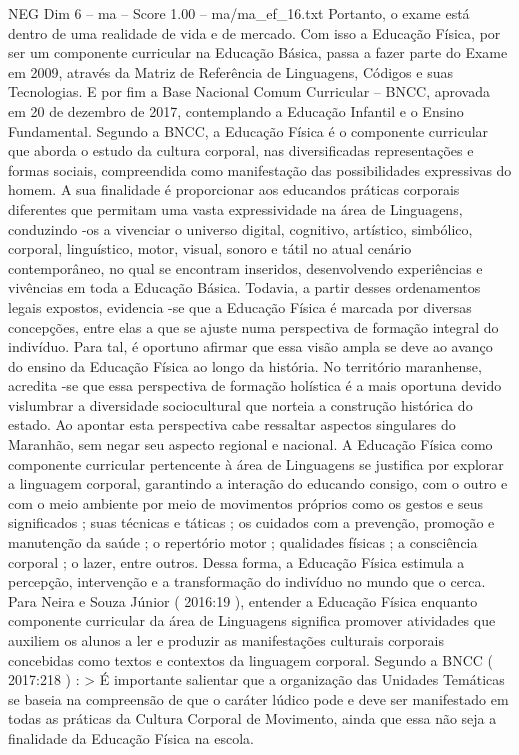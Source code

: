 \begin{textsample}{NEG Dim 6 – ma – Score 1.00 – ma/ma\_ef\_16.txt}
Portanto, o exame está dentro de uma realidade de vida e de mercado.
Com isso a Educação Física, por ser um componente curricular na Educação Básica, passa a fazer parte do Exame em 2009, através da Matriz de Referência de Linguagens, Códigos e suas Tecnologias.
E por fim a Base Nacional Comum Curricular – BNCC, aprovada em 20 de dezembro de 2017, contemplando a Educação Infantil e o Ensino Fundamental.
Segundo a BNCC, a Educação Física é o componente curricular que aborda o estudo da cultura corporal, nas diversificadas representações e formas sociais, compreendida como manifestação das possibilidades expressivas do homem.
A sua finalidade é proporcionar aos educandos práticas corporais diferentes que permitam uma vasta expressividade na área de Linguagens, conduzindo -os a vivenciar o universo digital, cognitivo, artístico, simbólico, corporal, linguístico, motor, visual, sonoro e tátil no atual cenário contemporâneo, no qual se encontram inseridos, desenvolvendo experiências e vivências em toda a Educação Básica.
Todavia, a partir desses ordenamentos legais expostos, evidencia -se que a Educação Física é marcada por diversas concepções, entre elas a que se ajuste numa perspectiva de formação integral do indivíduo.
Para tal, é oportuno afirmar que essa visão ampla se deve ao avanço do ensino da Educação Física ao longo da história.
No território maranhense, acredita -se que essa perspectiva de formação holística é a mais oportuna devido vislumbrar a diversidade sociocultural que norteia a construção histórica do estado.
Ao apontar esta perspectiva cabe ressaltar aspectos singulares do Maranhão, sem negar seu aspecto regional e nacional.
A Educação Física como componente curricular pertencente à área de Linguagens se justifica por explorar a linguagem corporal, garantindo a interação do educando consigo, com o outro e com o meio ambiente por meio de movimentos próprios como os gestos e seus significados ; suas técnicas e táticas ; os cuidados com a prevenção, promoção e manutenção da saúde ; o repertório motor ; qualidades físicas ; a consciência corporal ; o lazer, entre outros.
Dessa forma, a Educação Física estimula a percepção, intervenção e a transformação do indivíduo no mundo que o cerca.
Para Neira e Souza Júnior ( 2016:19 ), entender a Educação Física enquanto componente curricular da área de Linguagens significa promover atividades que auxiliem os alunos a ler e produzir as manifestações culturais corporais concebidas como textos e contextos da linguagem corporal.
Segundo a BNCC ( 2017:218 ) : > É importante salientar que a organização das Unidades Temáticas se baseia na compreensão de que o caráter lúdico pode e deve ser manifestado em todas as práticas da Cultura Corporal de Movimento, ainda que essa não seja a finalidade da Educação Física na escola.

\end{textsample}
